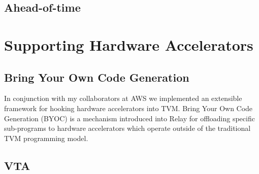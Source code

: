 
\subsection{Ahead-of-time}


\section{Supporting Hardware Accelerators}
\label{sec:accel}

\subsection{Bring Your Own Code Generation}

In conjunction with my collaborators at AWS we implemented an
  extensible framework for hooking hardware accelerators into
  TVM.
Bring Your Own Code Generation (BYOC) is a mechanism introduced
  into Relay for offloading specific sub-programs to hardware
  accelerators which operate outside of the traditional TVM
  programming model.


\subsection{VTA}

